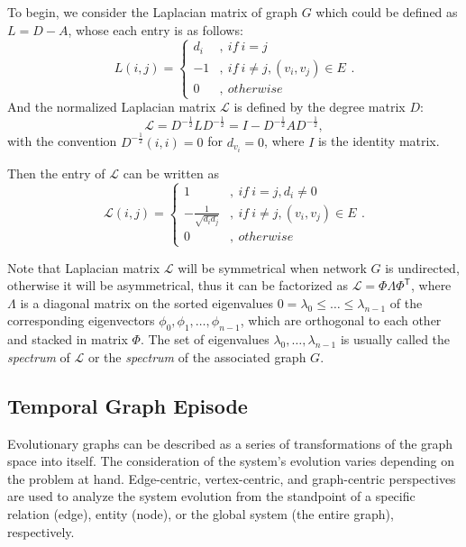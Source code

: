 \documentclass[10pt,journal,compsoc]{IEEEtran}
\begin{document}
To begin, we consider the Laplacian matrix of graph $G$ which could be defined as $L = D - A$, whose each entry is as follows:
\begin{equation}
     L(i, j) =\left\{
     \begin{aligned}
      d_{i}             &,  \ if \ i=j \\
      -1                &,  \ if \ i\neq j, (v_{i}, v_{j})\in E\\
      0                 &,  \ otherwise
      \end{aligned}.
      \right.
\end{equation}
And the normalized Laplacian matrix $\mathcal{L}$ is defined by the degree matrix $D$:
\begin{equation}
     \mathcal{L} = D^{-\frac{1}{2}} L D^{-\frac{1}{2}} = I - D^{-\frac{1}{2}}AD^{-\frac{1}{2}},
\end{equation}
with the convention $D^{-\frac{1}{2}}(i,i) = 0$ for $d_{v_{i}} = 0$, where $I$ is the identity matrix.


Then the entry of $\mathcal{L}$ can be written as
\begin{equation}
     \mathcal{L}(i, j) =\left\{
     \begin{aligned}
      1                             &,  \ if \ i=j,  d_{i} \neq 0\\
      -\frac{1}{\sqrt{d_{i}d_{j}}}  &,  \ if \ i\neq j, (v_{i}, v_{j})\in E\\
      0                             &,  \ otherwise
      \end{aligned}.
      \right.
\end{equation}


Note that Laplacian matrix $\mathcal{L}$ will be symmetrical when network $G$ is undirected, otherwise it will be asymmetrical, thus it can be factorized as $\mathcal{L} = \Phi \Lambda \Phi^{\mathsf{T}}$, where $\Lambda$ is a diagonal matrix on the sorted eigenvalues $0 = \lambda_{0} \leq \ldots \leq \lambda_{n-1}$ of the corresponding eigenvectors $\phi_{0},\phi_{1},\ldots, \phi_{n-1}$, which are orthogonal to each other and stacked in matrix $\Phi$. The set of eigenvalues $\lambda_{0}, \ldots , \lambda_{n-1}$ is usually called the \emph{spectrum} of $\mathcal{L}$ or the \emph{spectrum} of the associated graph $G$.


\subsection{Temporal Graph Episode}
Evolutionary graphs can be described as a series of transformations of the graph space into itself. The consideration of the system's evolution varies depending on the problem at hand. Edge-centric, vertex-centric, and graph-centric perspectives are used to analyze the system evolution from the standpoint of a specific relation (edge), entity (node), or the global system (the entire graph), respectively.
\end{document}

